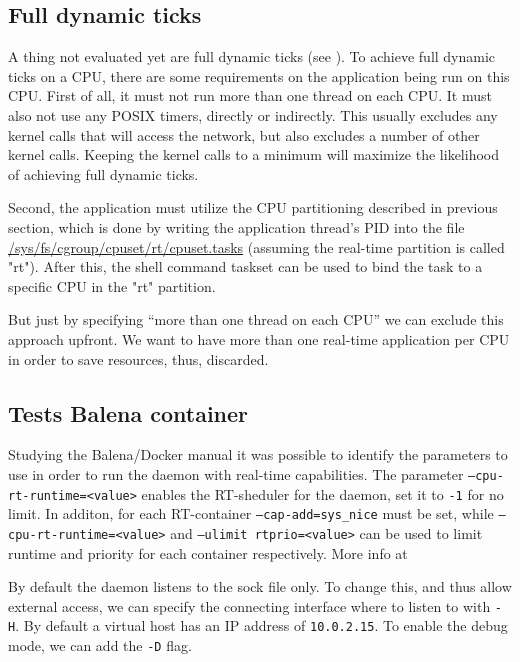 \documentclass[]{scrartcl}
\begin{document}
\subsection{Full dynamic ticks}

A thing not evaluated yet are full dynamic ticks (see \cite{lrt02}). To achieve full dynamic ticks on a CPU, there are some requirements on the application being run on this CPU. First of all, it must not run more than one thread on each CPU. It must also not use any POSIX timers, directly or indirectly. This usually excludes any kernel calls that will access the network, but also excludes a number of other kernel calls. Keeping the kernel calls to a minimum will maximize the likelihood of achieving full dynamic ticks.

Second, the application must utilize the CPU partitioning described in previous section, which is done by writing the application thread's PID into the file \url{/sys/fs/cgroup/cpuset/rt/cpuset.tasks} (assuming the real-time partition is called "rt"). After this, the shell command taskset can be used to bind the task to a specific CPU in the "rt" partition.

But just by specifying ``more than one thread on each CPU'' we can exclude this approach upfront. We want to have more than one real-time application per CPU in order to save resources, thus, discarded.

\subsection{Tests Balena container}

Studying the Balena/Docker manual it was possible to identify the parameters to use in order to run the daemon with real-time capabilities. The parameter \texttt{--cpu-rt-runtime=<value>} enables the RT-sheduler for the daemon, set it to \texttt{-1} for no limit. In additon, for each RT-container \texttt{--cap-add=sys\_nice} must be set, while \texttt{--cpu-rt-runtime=<value>} and \texttt{--ulimit rtprio=<value>} can be used to limit runtime and priority for each container respectively.
More info at \cite{docker06}

By default the daemon listens to the sock file only. To change this, and thus allow external access, we can specify the connecting interface where to listen to with \texttt{-H}. By default a virtual host has an IP address of \texttt{10.0.2.15}. To enable the debug mode, we can add the \texttt{-D} flag.
\end{document}
